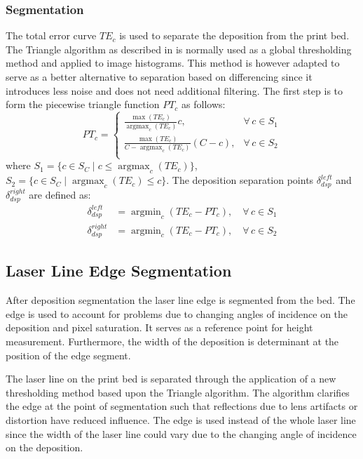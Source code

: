 \documentclass[10pt,letter]{article}
\DeclareMathOperator*{\argmax}{argmax}
\DeclareMathOperator*{\argmin}{argmin}
\begin{document}
\subsubsection{Segmentation}
The total error curve $TE_c$ is used to separate the deposition from the print bed. The Triangle algorithm as described in \cite{zack1977automatic} is normally used as a global thresholding method and applied to image histograms. This method is however adapted to serve as a better alternative to separation based on differencing since it introduces less noise and does not need additional filtering. The first step is to form the piecewise triangle function $PT_c$ as follows:
\begin{equation}
PT_c = \left.
  \begin{cases}
    \frac{\max ( TE_c )}{\argmax_c (TE_c)} c,  & \forall \, c \in S_1\\
    \frac{\max ( TE_c )}{C-\argmax_c (TE_c)} (C - c),  & \forall \, c \in S_2\\
  \end{cases}
  \right.
\end{equation}
where $S_1 = \{c \in S_C \mid  c \leq \argmax_c (TE_c) \}$, $S_2 = \{c \in S_C \mid \argmax_c (TE_c) \leq c\}$. The deposition separation points $\delta^{left}_{dsp}$ and $\delta^{right}_{dsp}$ are defined as: 
\begin{align}
\delta^{left}_{dsp} &= \argmin_c (TE_c - PT_c), \quad \forall\, c \in S_1  \\
\delta^{right}_{dsp} &=  \argmin_c (TE_c - PT_c), \quad \forall\, c \in S_2  
\end{align}

\subsection{Laser Line Edge Segmentation} \label{ssc: edgeseg}
After deposition segmentation the laser line edge is segmented from the bed. The edge is used to account for problems due to changing angles of incidence on the deposition and pixel saturation. It serves as a reference point for height measurement. Furthermore, the width of the deposition is determinant at the position of the edge segment. 

The laser line on the print bed is separated through the application of a new thresholding method based upon the Triangle algorithm. The algorithm clarifies the edge at the point of segmentation such that reflections due to lens artifacts or distortion have reduced influence. The edge is used instead of the whole laser line since the width of the laser line could vary due to the changing angle of incidence on the deposition.
\end{document}
